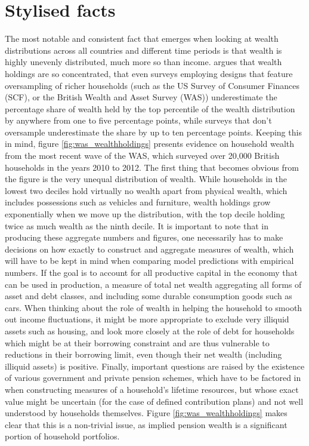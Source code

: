\section{Stylised facts}
The most notable and consistent fact that emerges when looking at wealth
distributions across all countries and different time periods is that wealth
is highly unevenly distributed, much more so than income. \citet{Vermeulen2014}
argues that wealth holdings are so concentrated, that even surveys employing 
designs that feature oversampling of richer households (such as the US Survey of
Consumer Finances (SCF), or the British Wealth and Asset Survey (WAS)) 
underestimate the percentage share of wealth held by the top percentile of the
wealth distribution by anywhere from one to five percentage points, while surveys
that don't oversample underestimate the share by up to ten percentage points.
Keeping this in mind, figure \ref{fig:was_wealthholdings} presents evidence on 
household wealth from the most recent wave of the WAS, which surveyed over 
20,000 British households in the years 2010 to 2012. The first thing that becomes
obvious from the figure is the very unequal distribution of wealth. While households
in the lowest two deciles hold virtually no wealth apart from physical 
wealth, which includes possessions such as vehicles and furniture, wealth holdings
grow exponentially when we move up the distribution, with the top decile 
holding twice as much wealth as the ninth decile. It is important to note
that in producing these aggregate numbers and figures, one necessarily has
to make decisions on how exactly to construct and aggregate measures of wealth,
which will have to be kept in mind when comparing model predictions with
empirical numbers. If the goal is to account for all productive capital in the 
economy that can be used in production, a measure of total net wealth aggregating 
all forms of asset and debt classes, and including some durable consumption 
goods such as cars. When thinking about the role of wealth in helping the 
household to smooth out
income fluctuations, it might be more appropriate to exclude very illiquid
assets such as housing, and look more closely at the role of debt for households
which might be at their borrowing constraint and are thus vulnerable to
reductions in their borrowing limit, even though their net wealth (including
illiquid assets) is positive. Finally, important questions are raised by
the existence of various government and private pension schemes, which have
to be factored in when constructing measures of a household's lifetime
resources, but whose exact value might be uncertain (for the case of defined
contribution plans) and not well understood by households themselves. Figure
\ref{fig:was_wealthholdings} makes clear that this is a non-trivial issue, as
implied pension wealth is a significant portion of household portfolios.

